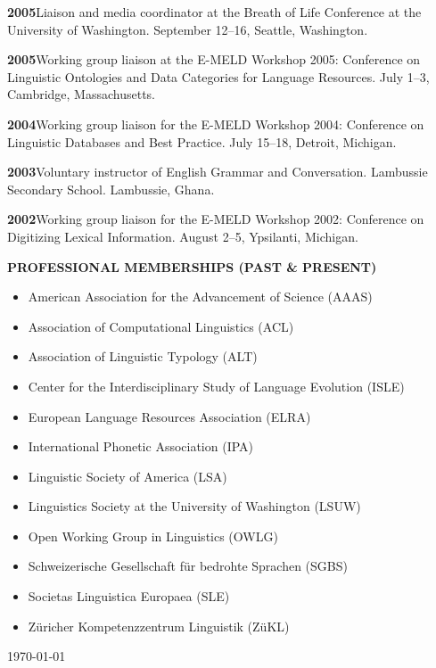 \documentclass[11pt]{article}
\newcommand{\hangpara}{
 \setlength{\parindent}{0in} %
 \hangindent=0.42in %
}
\begin{document}
\vskip 6pt
\hangpara
{\bf 2005}\hspace{1ex}Liaison and media coordinator at the Breath of Life Conference at the University of Washington. September 12--16, Seattle, Washington.

\vskip 6pt
\hangpara
{\bf 2005}\hspace{1ex}Working group liaison at the E-MELD Workshop 2005: Conference on Linguistic Ontologies and Data Categories for Language Resources. July 1--3, Cambridge, Massachusetts.

\vskip 6pt
\hangpara
{\bf 2004}\hspace{1ex}Working group liaison for the E-MELD Workshop 2004: Conference on Linguistic Databases and Best Practice. July 15--18, Detroit, Michigan.

\vskip 6pt
\hangpara
{\bf 2003}\hspace{1ex}Voluntary instructor of English Grammar and Conversation. Lambussie Secondary School. Lambussie, Ghana.

\vskip 6pt
\hangpara
{\bf 2002}\hspace{1ex}Working group liaison for the E-MELD Workshop 2002: Conference on Digitizing Lexical Information. August 2--5, Ypsilanti, Michigan.



\vskip 20pt
\begin{flushleft}
{\bf PROFESSIONAL MEMBERSHIPS (PAST \& PRESENT)}
\end{flushleft}
\begin{itemize}
\item American Association for the Advancement of Science (AAAS)
\item Association of Computational Linguistics (ACL)
\item Association of Linguistic Typology (ALT)
\item Center for the Interdisciplinary Study of Language Evolution (ISLE)
\item European Language Resources Association (ELRA)
\item International Phonetic Association (IPA)
\item Linguistic Society of America (LSA)
\item Linguistics Society at the University of Washington (LSUW)
\item Open Working Group in Linguistics (OWLG)
\item Schweizerische Gesellschaft f{\"u}r bedrohte Sprachen (SGBS)
\item Societas Linguistica Europaea (SLE)
\item Z{\"u}richer Kompetenzzentrum Linguistik (Z{\"u}KL)
\end{itemize}

\vskip 20pt
\today
\end{document}
